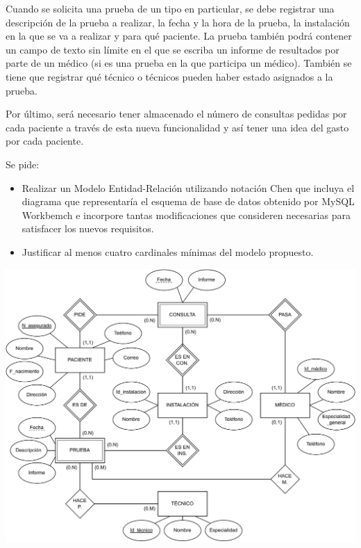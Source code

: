 \documentclass[
    12pt,
    a4paper,
    addpoints,
    answers,
    convocatoria=ord,
    titulacion=NoCD,
    curso=2023/2024,
]{db-exam}
\begin{document}
\begin{questions}
Cuando se solicita una prueba de un tipo en particular, se debe registrar una descripción de la prueba a realizar, la fecha y la hora de la prueba, la instalación en la que se va a realizar y para qué paciente. La prueba también podrá contener un campo de texto sin límite en el que se escriba un informe de resultados por parte de un médico (si es una prueba en la que participa un médico). También se tiene que registrar qué técnico o técnicos pueden haber estado asignados a la prueba. 

Por último, será necesario tener almacenado el número de consultas pedidas por cada paciente a través de esta nueva funcionalidad y así tener una idea del gasto por cada paciente.

Se pide: 

\begin{itemize}
    \item Realizar un Modelo Entidad-Relación utilizando notación Chen que incluya el diagrama que representaría el esquema de base de datos obtenido por MySQL Workbemch e incorpore tantas modificaciones que consideren necesarias para satisfacer los nuevos requisitos.
    \item Justificar al menos cuatro cardinales mínimas del modelo propuesto.
\end{itemize}

\begin{solution}
    \includegraphics[width=\textwidth]{figs/bbdd-2023-2024-ordinaria/mer-solucion.pdf}


\end{solution}
\end{questions}
\end{document}
